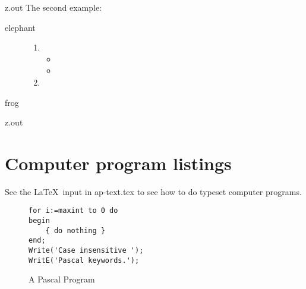 \MyIO


\begin{VerbatimOut}{z.out}
The second example:

\begin{description}
  \item[elephant]
    \begin{enumerate}
      \item
      \begin{itemize}
        \item
        \item
      \end{itemize}
      \item
    \end{enumerate}
  \item[frog]
\end{description}
\end{VerbatimOut}

\MyIO


\begin{VerbatimOut}{z.out}
\section{Computer program listings}

See the \LaTeX\ input in ap-text.tex
to see how to do typeset computer programs.

\lstset{language=Pascal}

\begin{figure}
  \caption{A Pascal Program}
  \begin{CenteredBox}
    \begin{lstlisting}
for i:=maxint to 0 do
begin
    { do nothing }
end;
Write('Case insensitive ');
WritE('Pascal keywords.');
    \end{lstlisting}
  \end{CenteredBox}
\end{figure}
\end{VerbatimOut}

\MyIO


